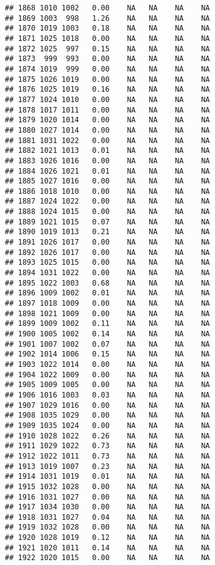 \documentclass{article}\usepackage{graphicx, color}
\makeatletter
\newenvironment{kframe}{%
 \def\at@end@of@kframe{}%
 \ifinner\ifhmode%
  \def\at@end@of@kframe{\end{minipage}}%
  \begin{minipage}{\columnwidth}%
 \fi\fi%
 \def\FrameCommand##1{\hskip\@totalleftmargin \hskip-\fboxsep
 \colorbox{shadecolor}{##1}\hskip-\fboxsep
     \hskip-\linewidth \hskip-\@totalleftmargin \hskip\columnwidth}%
 \MakeFramed {\advance\hsize-\width
   \@totalleftmargin\z@ \linewidth\hsize
   \@setminipage}}%
 {\par\unskip\endMakeFramed%
 \at@end@of@kframe}
\newenvironment{knitrout}{}{} %
\makeatother
\begin{document}
\begin{knitrout}
\begin{kframe}
\begin{verbatim}
## 1868 1010 1002   0.00    NA   NA    NA    NA
## 1869 1003  998   1.26    NA   NA    NA    NA
## 1870 1019 1003   0.18    NA   NA    NA    NA
## 1871 1025 1018   0.00    NA   NA    NA    NA
## 1872 1025  997   0.15    NA   NA    NA    NA
## 1873  999  993   0.00    NA   NA    NA    NA
## 1874 1019  999   0.00    NA   NA    NA    NA
## 1875 1026 1019   0.00    NA   NA    NA    NA
## 1876 1025 1019   0.16    NA   NA    NA    NA
## 1877 1024 1010   0.00    NA   NA    NA    NA
## 1878 1017 1011   0.00    NA   NA    NA    NA
## 1879 1020 1014   0.00    NA   NA    NA    NA
## 1880 1027 1014   0.00    NA   NA    NA    NA
## 1881 1031 1022   0.00    NA   NA    NA    NA
## 1882 1021 1013   0.01    NA   NA    NA    NA
## 1883 1026 1016   0.00    NA   NA    NA    NA
## 1884 1026 1021   0.01    NA   NA    NA    NA
## 1885 1027 1016   0.00    NA   NA    NA    NA
## 1886 1018 1010   0.00    NA   NA    NA    NA
## 1887 1024 1022   0.00    NA   NA    NA    NA
## 1888 1024 1015   0.00    NA   NA    NA    NA
## 1889 1021 1015   0.07    NA   NA    NA    NA
## 1890 1019 1013   0.21    NA   NA    NA    NA
## 1891 1026 1017   0.00    NA   NA    NA    NA
## 1892 1026 1017   0.00    NA   NA    NA    NA
## 1893 1025 1015   0.00    NA   NA    NA    NA
## 1894 1031 1022   0.00    NA   NA    NA    NA
## 1895 1022 1003   0.68    NA   NA    NA    NA
## 1896 1009 1002   0.01    NA   NA    NA    NA
## 1897 1018 1009   0.00    NA   NA    NA    NA
## 1898 1021 1009   0.00    NA   NA    NA    NA
## 1899 1009 1002   0.11    NA   NA    NA    NA
## 1900 1005 1002   0.14    NA   NA    NA    NA
## 1901 1007 1002   0.07    NA   NA    NA    NA
## 1902 1014 1006   0.15    NA   NA    NA    NA
## 1903 1022 1014   0.00    NA   NA    NA    NA
## 1904 1022 1009   0.00    NA   NA    NA    NA
## 1905 1009 1005   0.00    NA   NA    NA    NA
## 1906 1016 1003   0.03    NA   NA    NA    NA
## 1907 1029 1016   0.00    NA   NA    NA    NA
## 1908 1035 1029   0.00    NA   NA    NA    NA
## 1909 1035 1024   0.00    NA   NA    NA    NA
## 1910 1028 1022   0.26    NA   NA    NA    NA
## 1911 1029 1022   0.73    NA   NA    NA    NA
## 1912 1022 1011   0.73    NA   NA    NA    NA
## 1913 1019 1007   0.23    NA   NA    NA    NA
## 1914 1031 1019   0.01    NA   NA    NA    NA
## 1915 1032 1028   0.00    NA   NA    NA    NA
## 1916 1031 1027   0.00    NA   NA    NA    NA
## 1917 1034 1030   0.00    NA   NA    NA    NA
## 1918 1031 1027   0.04    NA   NA    NA    NA
## 1919 1032 1028   0.00    NA   NA    NA    NA
## 1920 1028 1019   0.12    NA   NA    NA    NA
## 1921 1020 1011   0.14    NA   NA    NA    NA
## 1922 1020 1015   0.00    NA   NA    NA    NA

\end{verbatim}
\end{kframe}
\end{knitrout}
\end{document}
